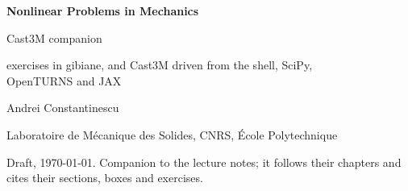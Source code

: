 \documentclass[11pt,a4paper,twoside,openright]{book}
\begin{document}
\frontmatter
\begin{titlepage}
\centering
\vspace*{3cm}
{\sffamily\bfseries\Huge Nonlinear Problems in Mechanics\par}
\vspace{8mm}
{\sffamily\LARGE Cast3M companion\par}
\vspace{4mm}
{\large exercises in gibiane, and Cast3M driven from the shell, SciPy,\\
OpenTURNS and JAX\par}
\vspace{2cm}
{\large Andrei Constantinescu\par}
\vspace{2mm}
{Laboratoire de M\'ecanique des Solides, CNRS, \'Ecole Polytechnique\par}
\vfill
{\small Draft, \today. Companion to the lecture notes; it follows their
chapters and cites their sections, boxes and exercises.\par}
\end{titlepage}

{\hypersetup{linkcolor=black}\tableofcontents}

\mainmatter

\setcounter{chapter}{0}
\setcounter{chapter}{1}
\setcounter{chapter}{2}
\setcounter{chapter}{3}
\setcounter{chapter}{4}
\setcounter{chapter}{5}
\setcounter{chapter}{6}
\end{document}
